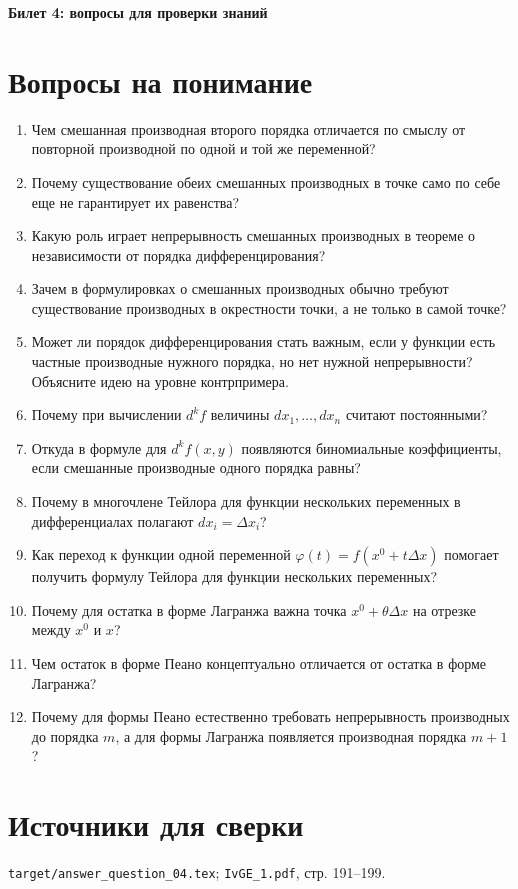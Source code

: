 \documentclass[12pt,a4paper]{article}
\begin{document}
\begin{center}
{\Large\bfseries Билет 4: вопросы для проверки знаний}
\end{center}

\noindent{}

\section*{Вопросы на понимание}

\begin{enumerate}
\item Чем смешанная производная второго порядка отличается по смыслу от повторной производной по одной и той же переменной?
\item Почему существование обеих смешанных производных в точке само по себе еще не гарантирует их равенства?
\item Какую роль играет непрерывность смешанных производных в теореме о независимости от порядка дифференцирования?
\item Зачем в формулировках о смешанных производных обычно требуют существование производных в окрестности точки, а не только в самой точке?
\item Может ли порядок дифференцирования стать важным, если у функции есть частные производные нужного порядка, но нет нужной непрерывности? Объясните идею на уровне контрпримера.
\item Почему при вычислении $d^k f$ величины $dx_1,\dots,dx_n$ считают постоянными?
\item Откуда в формуле для $d^k f(x,y)$ появляются биномиальные коэффициенты, если смешанные производные одного порядка равны?
\item Почему в многочлене Тейлора для функции нескольких переменных в дифференциалах полагают $dx_i=\Delta x_i$?
\item Как переход к функции одной переменной $\varphi(t)=f(x^0+t\Delta x)$ помогает получить формулу Тейлора для функции нескольких переменных?
\item Почему для остатка в форме Лагранжа важна точка $x^0+\theta\Delta x$ на отрезке между $x^0$ и $x$?
\item Чем остаток в форме Пеано концептуально отличается от остатка в форме Лагранжа?
\item Почему для формы Пеано естественно требовать непрерывность производных до порядка $m$, а для формы Лагранжа появляется производная порядка $m+1$?
\end{enumerate}

\section*{Источники для сверки}

\texttt{target/answer\_question\_04.tex};
\texttt{IvGE\_1.pdf}, стр. 191--199.
\end{document}
